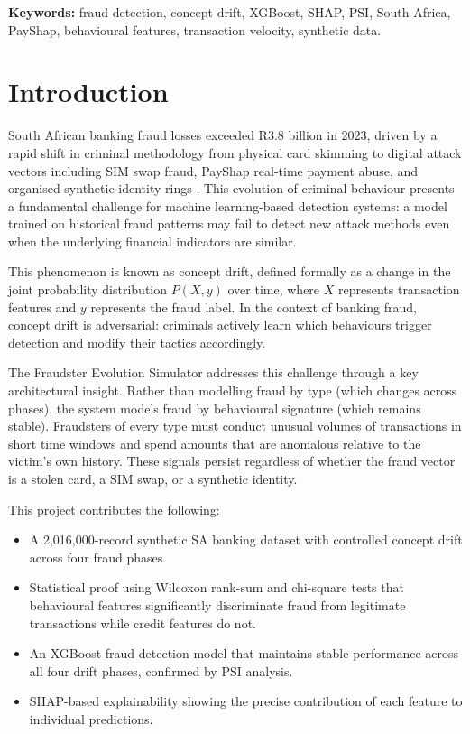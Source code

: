 \documentclass[12pt, a4paper]{article}
\begin{document}
\vspace{0.5cm}
\noindent\textbf{Keywords:} fraud detection, concept drift, XGBoost, SHAP, PSI, South Africa, PayShap, behavioural features, transaction velocity, synthetic data.

\section{Introduction}

South African banking fraud losses exceeded R3.8 billion in 2023, driven by a rapid shift in criminal methodology from physical card skimming to digital attack vectors including SIM swap fraud, PayShap real-time payment abuse, and organised synthetic identity rings \cite{sabric2023}. This evolution of criminal behaviour presents a fundamental challenge for machine learning-based detection systems: a model trained on historical fraud patterns may fail to detect new attack methods even when the underlying financial indicators are similar.

This phenomenon is known as concept drift, defined formally as a change in the joint probability distribution $P(X, y)$ over time, where $X$ represents transaction features and $y$ represents the fraud label. In the context of banking fraud, concept drift is adversarial: criminals actively learn which behaviours trigger detection and modify their tactics accordingly.

The Fraudster Evolution Simulator addresses this challenge through a key architectural insight. Rather than modelling fraud by type (which changes across phases), the system models fraud by behavioural signature (which remains stable). Fraudsters of every type must conduct unusual volumes of transactions in short time windows and spend amounts that are anomalous relative to the victim's own history. These signals persist regardless of whether the fraud vector is a stolen card, a SIM swap, or a synthetic identity.

This project contributes the following:

\begin{itemize}[leftmargin=1.5cm]
    \item A 2,016,000-record synthetic SA banking dataset with controlled concept drift across four fraud phases.
    \item Statistical proof using Wilcoxon rank-sum and chi-square tests that behavioural features significantly discriminate fraud from legitimate transactions while credit features do not.
    \item An XGBoost fraud detection model that maintains stable performance across all four drift phases, confirmed by PSI analysis.
    \item SHAP-based explainability showing the precise contribution of each feature to individual predictions.
\end{itemize}
\end{document}
